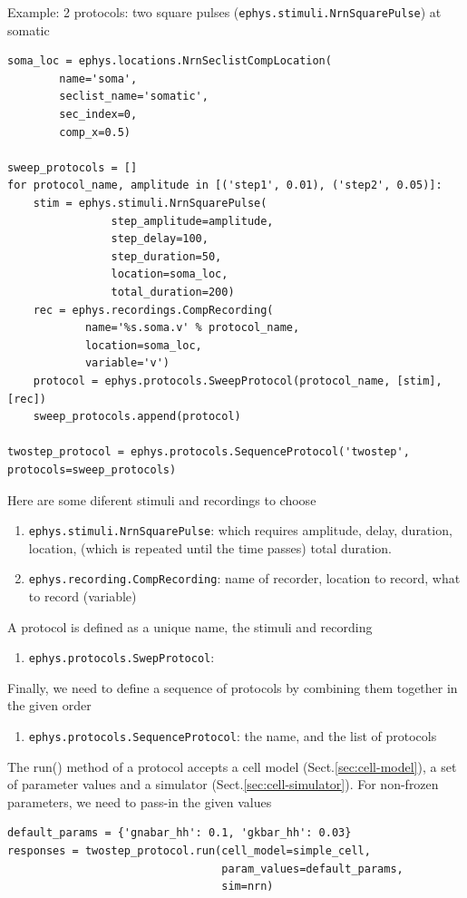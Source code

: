 Example: 2 protocols: two square pulses (\verb!ephys.stimuli.NrnSquarePulse!) at
somatic
\begin{lstlisting}
soma_loc = ephys.locations.NrnSeclistCompLocation(
        name='soma',
        seclist_name='somatic',
        sec_index=0,
        comp_x=0.5)

sweep_protocols = []
for protocol_name, amplitude in [('step1', 0.01), ('step2', 0.05)]:
    stim = ephys.stimuli.NrnSquarePulse(
                step_amplitude=amplitude,
                step_delay=100,
                step_duration=50,
                location=soma_loc,
                total_duration=200)
    rec = ephys.recordings.CompRecording(
            name='%s.soma.v' % protocol_name,
            location=soma_loc,
            variable='v')
    protocol = ephys.protocols.SweepProtocol(protocol_name, [stim], [rec])
    sweep_protocols.append(protocol)

twostep_protocol = ephys.protocols.SequenceProtocol('twostep', protocols=sweep_protocols)
\end{lstlisting}

Here are some diferent stimuli and recordings to choose
\begin{enumerate}
  \item \verb!ephys.stimuli.NrnSquarePulse!: which requires amplitude, delay,
  duration, location, (which is repeated until the time passes) total duration.

  \item \verb!ephys.recording.CompRecording!: name of recorder, location to
  record, what to record (variable)
\end{enumerate}

A protocol is defined as a unique name, the stimuli and recording
\begin{enumerate}
  \item \verb!ephys.protocols.SwepProtocol!:
\end{enumerate}

Finally, we need to define a sequence of protocols by combining them together in
the given order
\begin{enumerate}
  \item \verb!ephys.protocols.SequenceProtocol!: the name, and the list of
  protocols
\end{enumerate}


The run() method of a protocol accepts a cell model (Sect.\ref{sec:cell-model}),
a set of parameter values and a simulator (Sect.\ref{sec:cell-simulator}). For
non-frozen parameters, we need to pass-in the given values
\begin{lstlisting}
default_params = {'gnabar_hh': 0.1, 'gkbar_hh': 0.03}
responses = twostep_protocol.run(cell_model=simple_cell,
                                 param_values=default_params,
                                 sim=nrn)
\end{lstlisting}

